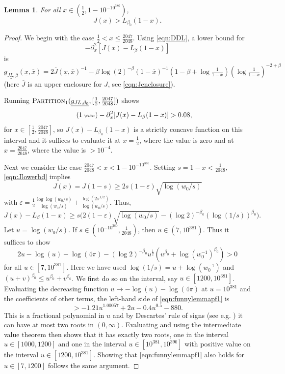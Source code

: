 \documentclass[12pt]{amsart}
\theoremstyle{plain}
\newtheorem{lem}[thm]{Lemma}
\newcommand{\auto}{\tag{\addtocounter{equation}{1}\theequation\;{\tiny\faCar}}}
\theoremstyle{definition}
\theoremstyle{remark}
\numberwithin{equation}{section}
\begin{document}
\begin{lem}\label{lem:JvsL_fun}
For all $x\in (\frac12, 1-10^{-10^{380}})$,
\[ J(x)>L_{\beta_0}(1-x).\]
\end{lem}

\begin{proof}
We begin with the case $\frac12<x\le \frac{2047}{2048}$.
Using \eqref{eqn:DDL}, a lower bound for 
\[-\partial_x^2[J(x)-L_\beta(1-x)]\]
is
\[ \underline{g_{JL,\beta}}(\underline{x},\overline{x}) = 2 \overline{J}(\underline{x},\overline{x})^{-1} -\beta \log(2)^{-\beta} (1-\overline{x})^{-1} (1-\beta+\log\tfrac1{1-\overline{x}})(\log\tfrac{1}{1-\underline{x}})^{-2+\beta} \]
(here $\overline{J}$ is an upper enclosure for $J$, see \eqref{eqn:Jenclosure}).

Running $\textsc{Partition}_1(\underline{g_{JL,\beta_0}},[\frac12,\frac{2047}{2048}])$ shows 
\begin{equation}\label{eqn:g_JL_auto}\auto
-\partial_x^2[J(x)-L_\beta(1-x)] > 0.08,
\end{equation}
for $x\in [\frac12,\frac{2047}{2048}]$, so $J(x)-L_{\beta_0}(1-x)$ is a strictly concave function on this interval and it suffices to evaluate it at $x=\frac12$, where the value is zero and at $x=\frac{2047}{2048}$, where the value is $>10^{-4}$. 

Next we consider the case $\frac{2047}{2048}<x<1-10^{-10^{380}}$. 
Setting $s=1-x<\frac1{2048}$, \eqref{eqn:Jlowerbd} implies 
\[ J(x)=J(1-s) \ge 2 s(1-\varepsilon) \sqrt{\log(w_0/s)} \]
with $
\varepsilon = \tfrac12 \tfrac{\log\log(w_0/s)}{\log(w_0/s)} + \tfrac{\log(2\pi^{1/2})}{\log(w_0/s)}.$
Thus,
\[ J(x) - L_\beta(1-x) \ge s \Big(2(1-\varepsilon)\sqrt{\log(w_0/s)} - (\log 2)^{-\beta_0} (\log(1/s))^{\beta_0}\Big). \]
Let $u=\log(w_0/s)$.
If $s\in (10^{-10^{380}}, \frac1{2048})$, then $u\in (7, 10^{381})$.
Thus it suffices to show
\begin{equation}\label{eqn:funnylemmapf1}
2u-\log(u)-\log(4\pi) - (\log 2)^{-\beta_0} u^{\frac12}(u^{\beta_0} +\log(w_0^{-1})^{\beta_0})>0
\end{equation}
for all $u\in [7,10^{381}]$.
Here we have used $\log(1/s)=u+\log(w_0^{-1})$ and $(u+v)^{\beta_0}\le u^{\beta_0}+v^{\beta_0}$.
We first do so on the interval, say $u\in [1200, 10^{381}]$.
Evaluating the decreasing function $u\mapsto -\log(u)-\log(4\pi)$ at $u=10^{381}$ and the coefficients of other terms, the left-hand side of \eqref{eqn:funnylemmapf1} is
\[ > - 1.21 u^{1.00057}+2u -0.4 u^{0.5} - 880. \]
This is a fractional polynomial in $u$ and by Descartes' rule of signs (see e.g. \cite{Jam06}) it can have at most two roots in $(0,\infty)$. Evaluating and using the intermediate value theorem then shows that it has exactly two roots, one in the interval $u\in [1000, 1200]$ and one in the interval $u\in [10^{381}, 10^{390}]$ with positive value on the interval $u\in [1200, 10^{381}]$.
Showing that \eqref{eqn:funnylemmapf1} also holds for $u\in [7, 1200]$ follows the same argument.
\end{proof}
\end{document}
